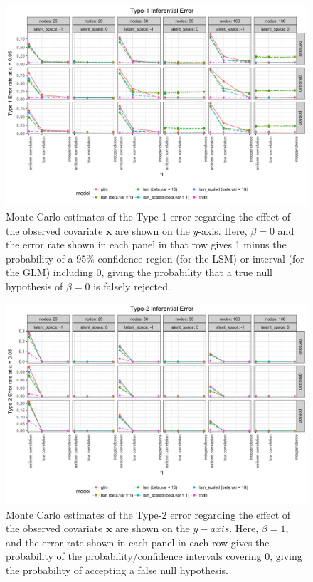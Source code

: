 \documentclass[11pt]{article}
\begin{document}
\begin{figure}
\includegraphics[width=\textwidth]{figures/inference_type_1.png}
\caption{Monte Carlo estimates of the Type-1 error regarding the effect of the observed covariate $\mathbf{x}$ are shown on the $y$-axis. Here, $\beta = 0$ and the error rate shown in each panel in that row gives 1 minus the probability of a 95\% confidence region (for the LSM) or interval (for the GLM) including $0$, giving the probability that a true null hypothesis of $\beta = 0$ is falsely rejected. \label{fig:inference_type_1}}
\end{figure}

\begin{figure}
\includegraphics[width=\textwidth]{figures/inference_type_2.png}
\caption{Monte Carlo estimates of the Type-2 error regarding the effect of the observed covariate $\mathbf{x}$ are shown on the $y-axis$. Here, $\beta = 1$, and the error rate shown in each panel in each row gives the probability of the probability/confidence intervals covering $0$, giving the probability of accepting a false null hypothesis. \label{fig:inference_type_2}}
\end{figure}
\end{document}
